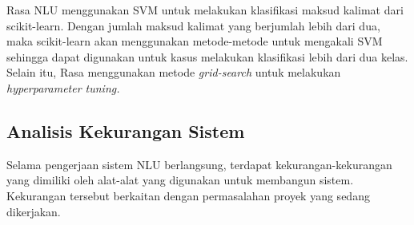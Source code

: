 Rasa NLU menggunakan SVM untuk melakukan klasifikasi maksud kalimat dari scikit-learn. Dengan jumlah maksud kalimat yang berjumlah lebih dari dua, maka scikit-learn akan menggunakan metode-metode untuk mengakali SVM sehingga dapat digunakan untuk kasus melakukan klasifikasi lebih dari dua kelas. Selain itu, Rasa menggunakan metode \textit{grid-search} untuk melakukan \textit{hyperparameter tuning.}

\subsection{Analisis Kekurangan Sistem}

Selama pengerjaan sistem NLU berlangsung, terdapat kekurangan-kekurangan yang dimiliki oleh alat-alat yang digunakan untuk membangun sistem. Kekurangan tersebut berkaitan dengan permasalahan proyek yang sedang dikerjakan.

%
%
%
%
